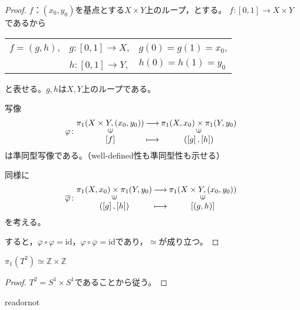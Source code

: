 \documentclass[uplatex]{jsarticle}
\begin{document}
\begin{proof}
  $f$：$(x_{0}, y_{0})$を基点とする$X \times Y$上のループ，とする。
  $f \colon [0,1] \longrightarrow X \times Y$であるから

  \renewcommand{\arraystretch}{1.0}
  \begin{tabular}{lll}
    $f = (g,h)$, & $g \colon [0,1] \longrightarrow X$, & $g(0) = g(1) = x_{0}$, \\
    & $h \colon [0,1] \longrightarrow Y$, & $h(0) = h(1) = y_{0}$
  \end{tabular}
  \renewcommand{\arraystretch}{1.3}

  と表せる。$g,h$は$X,Y$上のループである。
  
  写像
  \begin{equation}
    \varphi \colon \mapdef{\pi_{1}(X \times Y, (x_{0}, y_{0}))}{\pi_{1}(X, x_{0}) \times \pi_{1}(Y, y_{0})}{\left[ f \right]}{(\left[ g \right], \left[ h \right])}  
  \end{equation}
  は準同型写像である。（well-defined性も準同型性も示せる）

  同様に
  \begin{equation}
    \overline{\varphi} \colon \mapdef{\pi_{1}(X, x_{0}) \times \pi_{1}(Y, y_{0})}{\pi_{1}(X \times Y, (x_{0}, y_{0}))}{(\left[ g \right], \left[ h \right])}{\left[ (g,h) \right]}
  \end{equation}
  を考える。
  
  すると，$\overline{\varphi} \circ \varphi = \mathrm{id}$，$\varphi \circ \overline{\varphi} = \mathrm{id}$であり，$\simeq$が成り立つ。
\end{proof}

\sukima {}
\begin{corr}
  $\pi_{1}(T^{2}) \simeq \mathbb{Z} \times \mathbb{Z}$
\end{corr}

\begin{proof}
  $T^{2} = S^{1} \times S^{1}$であることから従う。
\end{proof}

\expandafter\ifx\csname readornot\endcsname\relax
  
\end{document}
